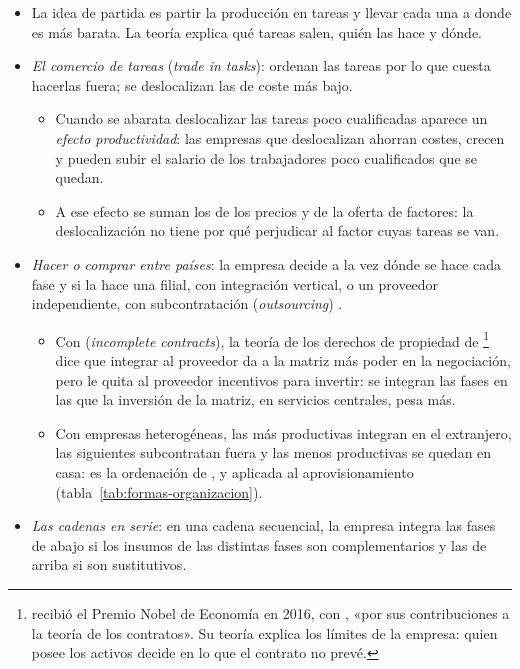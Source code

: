 \documentclass[11pt]{article}
\begin{document}
\begin{itemize}
\item La idea de partida es partir la producción en tareas y llevar cada una a donde es más barata. La teoría explica qué tareas salen, quién las hace y dónde.
\item \emph{El comercio de tareas} (\emph{trade in tasks}): \textcite{GrossmanRossiHansberg2008} ordenan las tareas por lo que cuesta hacerlas fuera; se deslocalizan las de coste más bajo.
  \begin{itemize}
  \item Cuando se abarata deslocalizar las tareas poco cualificadas aparece un \emph{efecto productividad}: las empresas que deslocalizan ahorran costes, crecen y pueden subir el salario de los trabajadores poco cualificados que se quedan.
  \item A ese efecto se suman los de los precios y de la oferta de factores: la deslocalización no tiene por qué perjudicar al factor cuyas tareas se van.
  \end{itemize}
\item \emph{Hacer o comprar entre países}: la empresa decide a la vez dónde se hace cada fase y si la hace una filial, con integración vertical, o un proveedor independiente, con subcontratación (\emph{outsourcing}) .
  \begin{itemize}
  \item Con  (\emph{incomplete contracts}), la teoría de los derechos de propiedad de \textcite{GrossmanHart1986Costs}\footnote{ recibió el Premio Nobel de Economía en 2016, con , «por sus contribuciones a la teoría de los contratos»\nocite{Nobel2016HartHolmstrom}. Su teoría explica los límites de la empresa: quien posee los activos decide en lo que el contrato no prevé.} dice que integrar al proveedor da a la matriz más poder en la negociación, pero le quita al proveedor incentivos para invertir: se integran las fases en las que la inversión de la matriz, en servicios centrales, pesa más\nocite{Antras2003Firms}.
  \item Con empresas heterogéneas, las más productivas integran en el extranjero, las siguientes subcontratan fuera y las menos productivas se quedan en casa: es la ordenación de ,  y  aplicada al aprovisionamiento (tabla~\ref{tab:formas-organizacion})\nocite{AntrasHelpman2004}.
  \end{itemize}
\item \emph{Las cadenas en serie}: en una cadena secuencial, la empresa integra las fases de abajo si los insumos de las distintas fases son complementarios y las de arriba si son sustitutivos\nocite{AntrasChor2013}.

\end{itemize}
\end{document}
